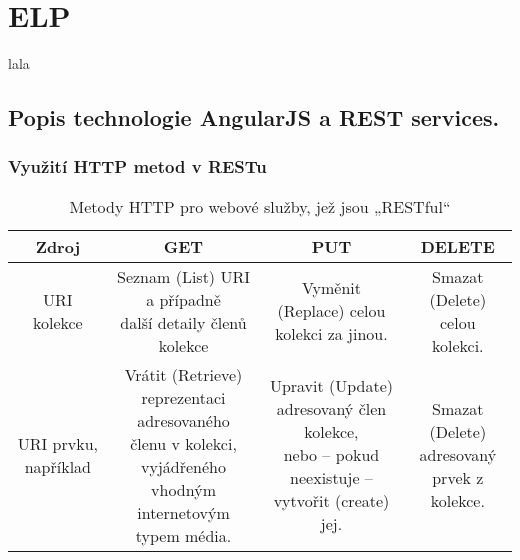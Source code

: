 \section{ELP}
lala

\subsection{Popis technologie AngularJS a REST services.}

\subsubsection{Využití HTTP metod v RESTu}
\begin{table}[h!]
\begin{adjustbox}{width=1\textwidth}
\begin{tabular}{|c|c|c|c|}
\hline
{\bf Zdroj} & {\bf GET} & {\bf PUT}  & {\bf DELETE} \\
\hline
\hline
URI kolekce & \makecell{Seznam (List) URI a případně \\ další detaily členů kolekce} & Vyměnit (Replace) celou kolekci za jinou. & \makecell{Smazat (Delete) celou \\kolekci.} \\
\hline
URI prvku, například  & \makecell{Vrátit (Retrieve) reprezentaci adresovaného \\členu v kolekci, vyjádřeného \\ vhodným internetovým typem média.} & \makecell{Upravit (Update) adresovaný člen kolekce, \\ nebo – pokud neexistuje – vytvořit (create) jej.}  & \makecell{Smazat (Delete)\\ adresovaný prvek z \\ kolekce.} \\
\hline
\end{tabular}
\end{adjustbox}
\caption{Metody HTTP pro webové služby, jež jsou „RESTful“ } 
\end{table} 